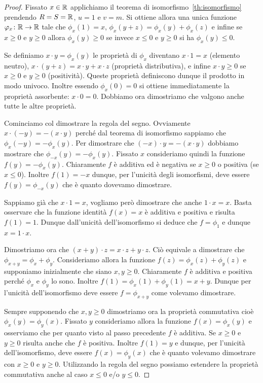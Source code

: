 %
\begin{proof}
Fissato $x\in {\mathbb R}$
applichiamo il teorema di isomorfismo~\ref{th:isomorfismo}
prendendo $R=S={\mathbb R}$, $u=1$ e $v=m$.
Si ottiene allora una unica funzione $\varphi_x\colon {\mathbb R}\to {\mathbb R}$ 
tale che $\phi_x(1)=x$, $\phi_x(y+z)=\phi_x(y)+\phi_x(z)$ 
e infine se $x\ge 0$ e $y\ge 0$ 
allora $\phi_x(y)\ge 0$ se 
invece $x\le 0$ e $y\ge 0$ si ha $\phi_x(y)\le 0$.

Se definiamo $x\cdot y = \phi_x(y)$ 
le proprietà di $\phi_x$ diventano 
$x\cdot 1 = x$ (elemento neutro), 
$x\cdot (y+z) = x\cdot y + x\cdot z$ (proprietà distributiva),
e infine $x\cdot y\ge 0$ se $x\ge 0$ e $y\ge 0$ (positività).
Queste proprietà definiscono dunque il prodotto 
in modo univoco. 
Inoltre essendo $\phi_x(0)=0$ si ottiene immediatamente 
la proprietà assorbente: $x\cdot 0 = 0$.
Dobbiamo ora dimostriamo che valgono anche tutte le 
altre proprietà. 

Cominciamo col dimostrare la regola del segno.
Ovviamente $x\cdot(-y) = -(x\cdot y)$ perché dal teorema 
di isomorfismo sappiamo che $\phi_x(-y) = -\phi_x(y)$.
Per dimostrare che $(-x)\cdot y=-(x\cdot y)$ dobbiamo 
mostrare che $\phi_{-x}(y)=-\phi_x(y)$. 
Fissato $x$ consideriamo quindi la funzione 
$f(y) = -\phi_x(y)$. 
Chiaramente $f$ è additiva ed è negativa se $x\ge 0$
o positiva (se $x\le 0$). 
Inoltre $f(1) = -x$ dunque, per l'unicità degli isomorfismi,
deve essere $f(y) = \phi_{-x}(y)$ che è quanto dovevamo dimostrare.

Sappiamo già che $x\cdot 1=x$, vogliamo però dimostrare 
che anche $1\cdot x=x$. 
Basta osservare che la funzione identità $f(x)=x$ 
è additiva e positiva e risulta $f(1)=1$.
Dunque dall'unicità dell'isomorfismo si deduce che $f = \phi_1$
e dunque $x=1\cdot x$.

Dimostriamo ora che $(x+y)\cdot z = x\cdot z + y\cdot z$.
Ciò equivale a dimostrare che $\phi_{x+y} = \phi_x + \phi_y$.
Consideriamo allora la funzione $f(z)=\phi_x(z) + \phi_y(z)$
e supponiamo inizialmente che siano $x,y\ge 0$.
Chiaramente $f$ è additiva e positiva
perché $\phi_x$ e $\phi_y$ lo sono.
Inoltre $f(1)=\phi_x(1) + \phi_y(1) = x+y$. 
Dunque per l'unicità dell'isomorfismo 
deve essere $f = \phi_{x+y}$ come volevamo dimostrare.

Sempre supponendo che $x,y\ge 0$ 
dimostriamo ora la proprietà commutativa cioè
$\phi_x(y) = \phi_y(x)$. 
Fissato $y$ consideriamo allora la funzione $f(x) = \phi_x(y)$
e osserviamo che per quanto visto al passo precedente 
$f$ è additiva. 
Se $x\ge 0$ e $y\ge 0$ risulta anche che $f$ è positiva.
Inoltre $f(1) = y$ e dunque, per l'unicità dell'isomorfismo,
deve essere $f(x) = \phi_y(x)$ che è quanto volevamo dimostrare
con $x\ge 0$ e $y\ge 0$.
Utilizzando la regola del segno possiamo estendere 
la proprietà commutativa anche al caso $x\le 0$ e/o $y\le 0$.


\end{proof}
